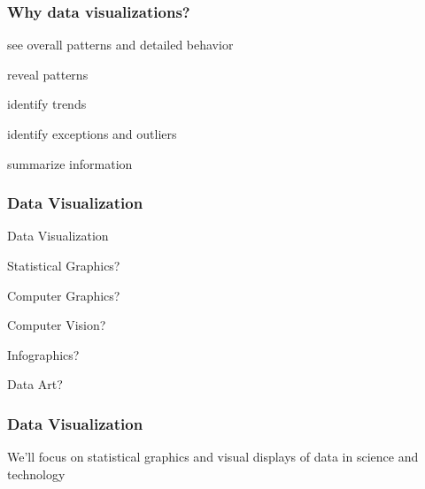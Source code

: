 \documentclass[12pt]{beamer}\usepackage[]{graphicx}\usepackage[]{color}
\begin{document}

\begin{frame}
\frametitle{Why data visualizations?}

\bbi
  \item see overall patterns and detailed behavior
  \item reveal patterns
  \item identify trends
  \item identify exceptions and outliers
  \item summarize information
\ei

\end{frame}


\begin{frame}
\frametitle{Data Visualization}

Data Visualization
\bi
  \item Statistical Graphics?
  \item Computer Graphics?
  \item Computer Vision?
  \item Infographics?
  \item Data Art?
\ei

\end{frame}


\begin{frame}
\frametitle{Data Visualization}

{\Large We'll focus on statistical graphics and visual displays of data in 
science and technology}

\end{frame}

\end{document}
